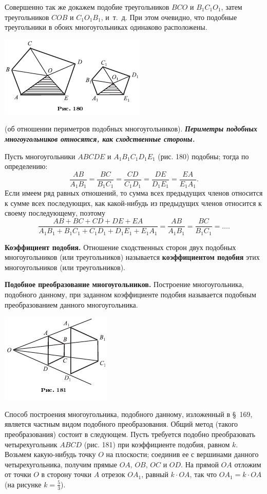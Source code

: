 \documentclass[oneside]{book}
\begin{document}
Совершенно так же докажем подобие треугольников $BCO$ и $B_1C_1O_1$, затем треугольников $COB$ и $C_1O_1B_1$, и~т.~д.
При этом очевидно, что подобные треугольники в обоих многоугольниках одинаково расположены.

\includegraphics{pics/ris-180}

 (об отношении периметров подобных многоугольников).
\textbf{\emph{Периметры подобных многоугольников относятся, как сходственные стороны.}}

Пусть многоугольники $ABCDE$ и $A_1B_1C_1D_1E_1$ (рис. 180) подобны;
тогда по определению:
\[\frac{AB}{A_1B_1}=\frac{BC}{B_1C_1}=\frac{CD}{C_1D_1}=\frac{DE}{D_1E_1}=\frac{EA}{E_1A_1}.\]
Если имеем ряд равных отношений, то сумма всех предыдущих членов относится к сумме всех последующих, как какой-нибудь из предыдущих членов относится к своему последующему, поэтому
\[\frac{AB+BC+CD+DE+EA}{A_1B_1+B_1C_1+C_1D_1+D_1E_1+E_1A_1}=\frac{AB}{A_1B_1}=\frac{BC}{B_1C_1}=\dots.\]


\textbf{Коэффициент подобия.}
Отношение сходственных сторон двух подобных многоугольников (или треугольников) называется \textbf{коэффициентом подобия} этих многоугольников (или треугольников).

\textbf{Подобное преобразование многоугольников.}
Построение многоугольника, подобного данному, при заданном коэффициенте подобия называется подобным преобразованием данного многоугольника.

\includegraphics{pics/ris-181}

Способ построения многоугольника, подобного данному, изложенный в §~169, является частным видом подобного преобразования.
Общий метод (такого преобразования) состоит в следующем.
Пусть требуется подобно преобразовать четырехугольник $ABCD$ (рис. 181) при коэффициенте подобия, равном $k$.
Возьмем какую-нибудь точку $O$ на плоскости;
соединив ее с вершинами данного четырехугольника, получим прямые $OA$, $OB$, $OC$ и $OD$.
На прямой $OA$ отложим от точки $O$ в сторону точки $A$ отрезок $OA_1$, равный $k\cdot OA$, так что $OA_1=k\cdot OA$ (на рисунке $k=\tfrac53$).
\end{document}
